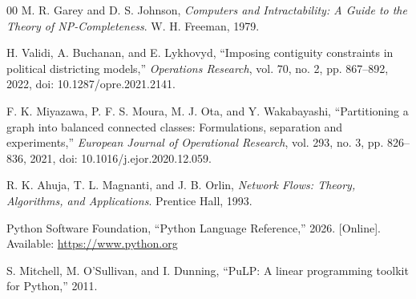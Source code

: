 \documentclass[conference]{IEEEtran}
\begin{document}
\begin{thebibliography}{00}
M. R. Garey and D. S. Johnson, \emph{Computers and Intractability: A Guide to
the Theory of NP-Completeness}. W. H. Freeman, 1979.

H. Validi, A. Buchanan, and E. Lykhovyd, ``Imposing contiguity constraints in
political districting models,'' \emph{Operations Research}, vol. 70, no. 2,
pp. 867--892, 2022, doi: 10.1287/opre.2021.2141.

F. K. Miyazawa, P. F. S. Moura, M. J. Ota, and Y. Wakabayashi,
``Partitioning a graph into balanced connected classes: Formulations,
separation and experiments,'' \emph{European Journal of Operational Research},
vol. 293, no. 3, pp. 826--836, 2021, doi: 10.1016/j.ejor.2020.12.059.

R. K. Ahuja, T. L. Magnanti, and J. B. Orlin, \emph{Network Flows: Theory,
Algorithms, and Applications}. Prentice Hall, 1993.

Python Software Foundation, ``Python Language Reference,'' 2026. [Online].
Available: \url{https://www.python.org}

S. Mitchell, M. O'Sullivan, and I. Dunning, ``PuLP: A linear programming
toolkit for Python,'' 2011.
\end{thebibliography}
\end{document}
